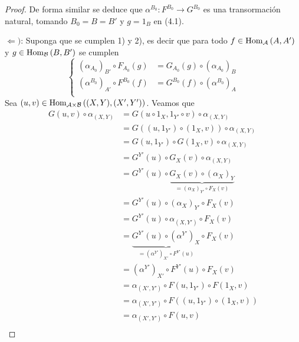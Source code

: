 \documentclass[12pt]{report}
\theoremstyle{largebreak}
\newcommand\cf[3]{\ensuremath{#1:#2\rightarrow#3}}
\newcommand{\Hom}[3]{\ensuremath{\textup{Hom}_{#1}\left(#2,#3\right)}}
\begin{document}
\begin{proof}
        De forma similar se deduce que $\cf{\alpha^{B_0}}{F^{B_0}}{G^{B_0}}$ es una transormación natural, tomando $B_0=B=B'$ y $g=1_B$ en (4.1).
        
        $\Leftarrow)$: Suponga que se cumplen 1) y 2), es decir que para todo $f\in\Hom{\mathcal{A}}{A}{A'}$ y $g\in\Hom{\mathcal{B}}{B}{B'}$ se cumplen
        \begin{equation*}
            \left\{
                \begin{split}
                    (\alpha_{A_0})_{B'}\circ F_{A_0}(g)&=G_{A_0}(g)\circ (\alpha_{A_0})_B\\
                    (\alpha^{B_0})_{A'}\circ F^{B_0}(f)&=G^{B_0}(f)\circ (\alpha^{B_0})_A\\
                \end{split}
            \right.
        \end{equation*}
        Sea $(u,v)\in\Hom{\mathcal{A}\times\mathcal{B}}{(X,Y)}{(X',Y')}$. Veamos que
        \begin{equation*}
            \begin{split}
                G(u,v)\circ\alpha_{(X,Y)}&=G(u\circ 1_X,1_{Y'}\circ v)\circ\alpha_{(X,Y)}\\
                &=G((u,1_{Y'})\circ(1_X,v))\circ\alpha_{(X,Y)}\\
                &=G(u,1_{Y'})\circ G(1_X,v)\circ\alpha_{(X,Y)}\\
                &=G^{Y'}(u)\circ G_X(v)\circ\alpha_{(X,Y)}\\
                &=G^{Y'}(u)\circ \underbrace{G_X(v)\circ(\alpha_X)_Y}_{=(\alpha_X)_{Y'}\circ F_X(v)} \\
                &=G^{Y'}(u)\circ (\alpha_X)_{Y'}\circ F_X(v)\\
                &=G^{Y'}(u)\circ\alpha_{(X,Y')}\circ F_X(v)\\
                &=\underbrace{G^{Y'}(u)\circ(\alpha^{ Y'})_X}_{= (\alpha^{Y'})_{X'}\circ F^{Y'}(u)} \circ F_X(v)\\
                &=(\alpha^{Y'})_{X'}\circ F^{Y'}(u)\circ F_X(v)\\
                &=\alpha_{(X',Y')} \circ F(u,1_{Y'})\circ F(1_X,v)\\
                &=\alpha_{(X',Y')} \circ F((u,1_{Y'})\circ(1_X,v))\\
                &=\alpha_{(X',Y')} \circ F(u,v)\\
            \end{split}
        \end{equation*}

\end{proof}
\end{document}
